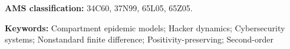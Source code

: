\documentclass[11pt]{article}
\theoremstyle{definition}
\theoremstyle{remark}
\numberwithin{equation}{section}
\begin{document}
\begin{abstract}


\end{abstract}

\begin{minipage}{0.9\linewidth}
 \footnotesize
\textbf{AMS classification:} 34C60, 37N99, 65L05, 65Z05.

\medskip\noindent
\textbf{Keywords:} 
Compartment epidemic models; Hacker dynamics; Cybersecurity systems; Nonstandard finite difference; Positivity-preserving; Second-order

\end{minipage}
\end{document}
